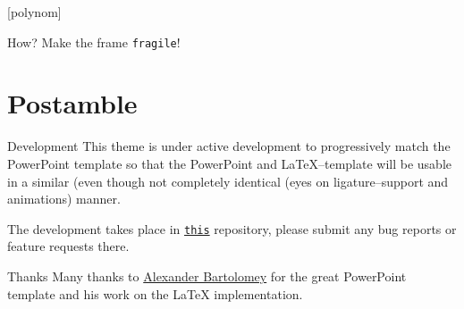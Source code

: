 \documentclass[fragile]{beamer}
\begin{document}
[polynom]{}
\begin{frame}{How?}
  Make the frame \lstinline{fragile}!
\end{frame}

\section{Postamble}
\begin{frame}{Development}
  This theme is under active development to progressively match the
  PowerPoint template so that the PowerPoint and LaTeX--template will
  be usable in a similar (even though not completely identical (eyes on
  ligature--support and animations) manner.

  The development takes place in
  \href{https://git.rwth-aachen.de/ACHinrichs/LaTeX-templates/}{\texttt{this}}
  repository, please submit any bug reports or feature requests there.
\end{frame}

\begin{frame}{Thanks}
  Many thanks to \href{https://www.occloxium.com/}{Alexander Bartolomey} for 
  the great PowerPoint template and his work on the LaTeX implementation. 
\end{frame}
\end{document}
